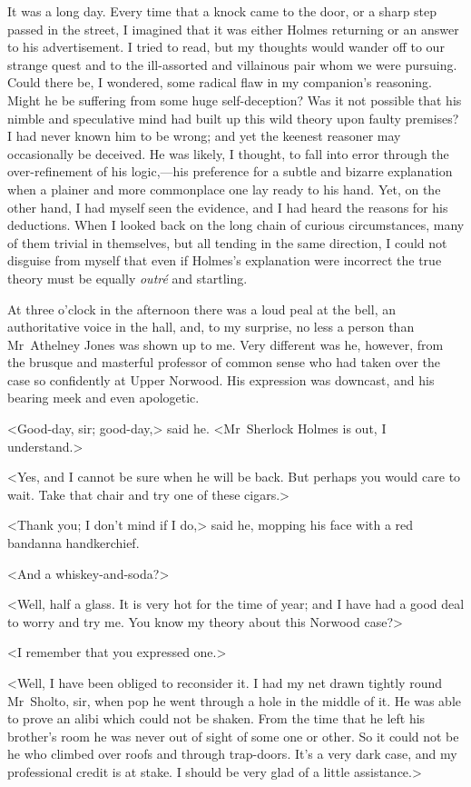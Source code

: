 It was a long day. Every time that a knock came to the door, or a sharp step passed in the street, I imagined that it was either Holmes returning or an answer to his advertisement. I tried to read, but my thoughts would wander off to our strange quest and to the ill-assorted and villainous pair whom we were pursuing. Could there be, I wondered, some radical flaw in my companion's reasoning. Might he be suffering from some huge self-deception? Was it not possible that his nimble and speculative mind had built up this wild theory upon faulty premises? I had never known him to be wrong; and yet the keenest reasoner may occasionally be deceived. He was likely, I thought, to fall into error through the over-refinement of his logic,—his preference for a subtle and bizarre explanation when a plainer and more commonplace one lay ready to his hand. Yet, on the other hand, I had myself seen the evidence, and I had heard the reasons for his deductions. When I looked back on the long chain of curious circumstances, many of them trivial in themselves, but all tending in the same direction, I could not disguise from myself that even if Holmes's explanation were incorrect the true theory must be equally \textit{outré} and startling.

At three o'clock in the afternoon there was a loud peal at the bell, an authoritative voice in the hall, and, to my surprise, no less a person than Mr~Athelney Jones was shown up to me. Very different was he, however, from the brusque and masterful professor of common sense who had taken over the case so confidently at Upper Norwood. His expression was downcast, and his bearing meek and even apologetic.

<Good-day, sir; good-day,> said he. <Mr~Sherlock Holmes is out, I understand.>

<Yes, and I cannot be sure when he will be back. But perhaps you would care to wait. Take that chair and try one of these cigars.>

<Thank you; I don't mind if I do,> said he, mopping his face with a red bandanna handkerchief.

<And a whiskey-and-soda?>

<Well, half a glass. It is very hot for the time of year; and I have had a good deal to worry and try me. You know my theory about this Norwood case?>

<I remember that you expressed one.>

<Well, I have been obliged to reconsider it. I had my net drawn tightly round Mr~Sholto, sir, when pop he went through a hole in the middle of it. He was able to prove an alibi which could not be shaken. From the time that he left his brother's room he was never out of sight of some one or other. So it could not be he who climbed over roofs and through trap-doors. It's a very dark case, and my professional credit is at stake. I should be very glad of a little assistance.>


